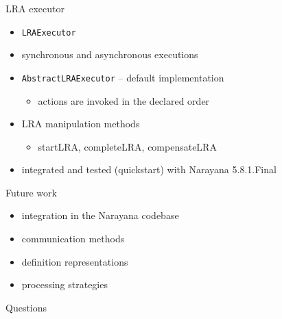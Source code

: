 \documentclass{beamer}
\begin{document}
\begin{frame}{LRA executor}

\begin{itemize}
    \item \texttt{LRAExecutor}
    \item synchronous and asynchronous executions
    \item \texttt{AbstractLRAExecutor} -- default implementation
    \begin{itemize}
        \item actions are invoked in the declared order
    \end{itemize}
    \item LRA manipulation methods
    \begin{itemize}
        \item startLRA, completeLRA, compensateLRA
    \end{itemize}
    \item integrated and tested (quickstart) with Narayana 5.8.1.Final
\end{itemize}


\end{frame}

\begin{frame}{Future work}

\begin{itemize}
    \item integration in the Narayana codebase
    \item communication methods 
    \item definition representations
    \item processing strategies
\end{itemize}

\end{frame}

\begin{frame}{Questions}

\end{frame}
\end{document}
